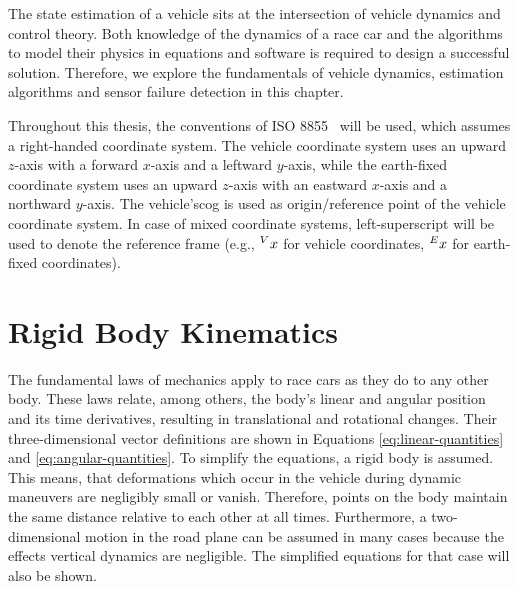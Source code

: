 The state estimation of a vehicle sits at the intersection of vehicle dynamics and control theory. Both knowledge of the dynamics of a race car and the algorithms to model their physics in equations and software is required to design a successful solution. Therefore, we explore the fundamentals of vehicle dynamics, estimation algorithms and sensor failure detection in this chapter.

Throughout this thesis, the conventions of ISO 8855~\cite{ISO.2011} will be used, which assumes a right-handed coordinate system. The vehicle coordinate system uses an upward $z$-axis with a forward $x$-axis and a leftward $y$-axis, while the earth-fixed coordinate system uses an upward $z$-axis with an eastward $x$-axis and a northward $y$-axis. The vehicle's\gls{cog} is used as origin/reference point of the vehicle coordinate system. In case of mixed coordinate systems, left-superscript will be used to denote the reference frame (e.g., $\prescript{V}{}{x}$ for vehicle coordinates, $\prescript{E}{}{x}$ for earth-fixed coordinates).



\section{Rigid Body Kinematics}
The fundamental laws of mechanics apply to race cars as they do to any other body. These laws relate, among others, the body's linear and angular position and its time derivatives, resulting in translational and rotational changes. Their three-dimensional vector definitions are shown in Equations \ref{eq:linear-quantities} and \ref{eq:angular-quantities}. To simplify the equations, a rigid body is assumed. This means, that deformations which occur in the vehicle during dynamic maneuvers are negligibly small or vanish. Therefore, points on the body maintain the same distance relative to each other at all times. Furthermore, a two-dimensional motion in the road plane can be assumed in many cases because the effects vertical dynamics are negligible. The simplified equations for that case will also be shown.

